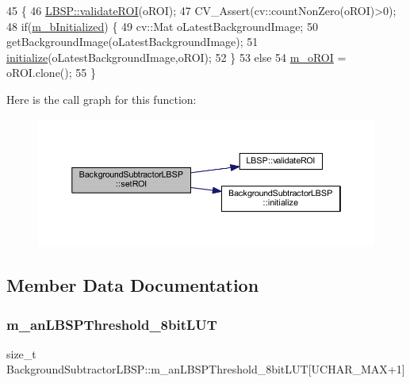 \begin{DoxyCode}
45                                                  \{
46     \mbox{\hyperlink{class_l_b_s_p_ad97557be4bc6cfd7b0fa4b01ab8f8c55}{LBSP::validateROI}}(oROI);
47     CV\_Assert(cv::countNonZero(oROI)>0);
48     \textcolor{keywordflow}{if}(\mbox{\hyperlink{class_background_subtractor_l_b_s_p_a55cea104a0924fd50d5bed0912828a7e}{m\_bInitialized}}) \{
49         cv::Mat oLatestBackgroundImage;
50         getBackgroundImage(oLatestBackgroundImage);
51         \mbox{\hyperlink{class_background_subtractor_l_b_s_p_ac6b854f94414497b143375d4a0ae8b6f}{initialize}}(oLatestBackgroundImage,oROI);
52     \}
53     \textcolor{keywordflow}{else}
54         \mbox{\hyperlink{class_background_subtractor_l_b_s_p_a53fe98bd2489d95de5292467145901e9}{m\_oROI}} = oROI.clone();
55 \}
\end{DoxyCode}
Here is the call graph for this function\+:
\nopagebreak
\begin{figure}[H]
\begin{center}
\leavevmode
\includegraphics[width=350pt]{class_background_subtractor_l_b_s_p_a34dc38d3d925d46d289c750786f232dc_cgraph}
\end{center}
\end{figure}


\subsection{Member Data Documentation}
\mbox{\label{class_background_subtractor_l_b_s_p_aefe69d94f08b2c4ba73ad1d254ad9153}} 
\subsubsection{\texorpdfstring{m\+\_\+an\+L\+B\+S\+P\+Threshold\+\_\+8bit\+L\+UT}{m\_anLBSPThreshold\_8bitLUT}}
{\footnotesize\ttfamily size\+\_\+t Background\+Subtractor\+L\+B\+S\+P\+::m\+\_\+an\+L\+B\+S\+P\+Threshold\+\_\+8bit\+L\+UT\mbox{[}U\+C\+H\+A\+R\+\_\+\+M\+AX+1\mbox{]}\hspace{0.3cm}{\ttfamily [protected]}}



